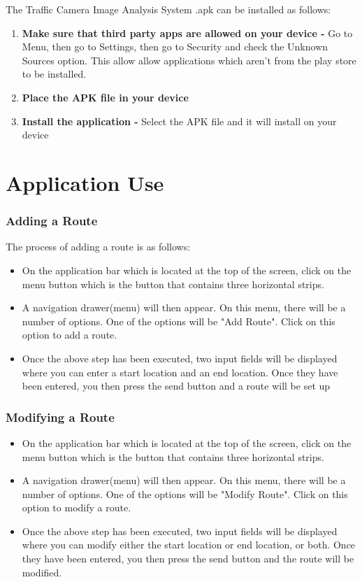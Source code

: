 \documentclass[a4paper,12pt]{article}
\begin{document}
The Traffic Camera Image Analysis System .apk can be installed as follows:
\begin{enumerate}
\item \textbf{Make sure that third party apps are allowed on your device -} Go to Menu, then go to Settings, then go to Security and check the Unknown Sources option. This allow allow applications which aren't from the play store to be installed.
\item \textbf{Place the APK file in your device} 
\item \textbf{Install the application -} Select the APK file and it will install on your device
\end{enumerate}

\section{Application Use}
\subsubsection{Adding a Route}
The process of adding a route is as follows:
\begin{itemize}
    \item On the application bar which is located at the top of the screen, click on the menu button which is the button that contains three horizontal strips.
    \item A navigation drawer(menu) will then appear. On this menu, there will be a number of options. One of the options will be "Add Route". Click on this option to add a route.
    \item Once the above step has been executed, two input fields will be displayed  where you can enter a start location and an end location. Once they have been entered, you then press the send button and a route will be set up
\end{itemize}
\subsubsection{Modifying a Route}
\begin{itemize}
    \item On the application bar which is located at the top of the screen, click on the menu button which is the button that contains three horizontal strips.
    \item A navigation drawer(menu) will then appear. On this menu, there will be a number of options. One of the options will be "Modify Route". Click on this option to modify a route.
    \item Once the above step has been executed, two input fields will be displayed  where you can modify either the start location or end location, or both. Once they have been entered, you then press the send button and the route will be modified.
\end{itemize}
\end{document}

